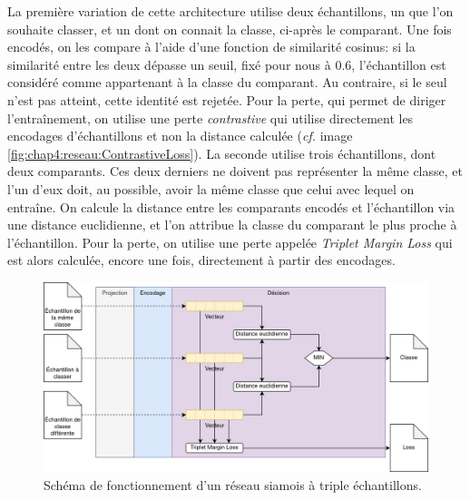 La première variation de cette architecture utilise deux échantillons, un que l'on souhaite classer, et un dont on connait la classe, ci-après le comparant. Une fois encodés, on les compare à l'aide d'une fonction de similarité cosinus: si la similarité entre les deux dépasse un seuil, fixé pour nous à 0.6, l'échantillon est considéré comme appartenant à la classe du comparant. Au contraire, si le seul n'est pas atteint, cette identité est rejetée. Pour la perte, qui permet de diriger l'entraînement, on utilise une perte \textit{contrastive} qui utilise directement les encodages d'échantillons et non la distance calculée (\textit{cf.} image \ref{fig:chap4:reseau:ContrastiveLoss}). La seconde utilise trois échantillons, dont deux comparants. Ces deux derniers ne doivent pas représenter la même classe, et l'un d'eux doit, au possible, avoir la même classe que celui avec lequel on entraîne. On calcule la distance entre les comparants encodés et l'échantillon via une distance euclidienne, et l'on attribue la classe du comparant le plus proche à l'échantillon. Pour la perte, on utilise une perte appelée \textit{Triplet Margin Loss} qui est alors calculée, encore une fois, directement à partir des encodages.

\begin{figure}[ht]
    \centering
    \includegraphics[width=\linewidth]{figures/chap4/triplet.png}
    \caption{Schéma de fonctionnement d'un réseau siamois à triple échantillons.}
    \label{fig:chap4:reseau:Triplet}
\end{figure}

